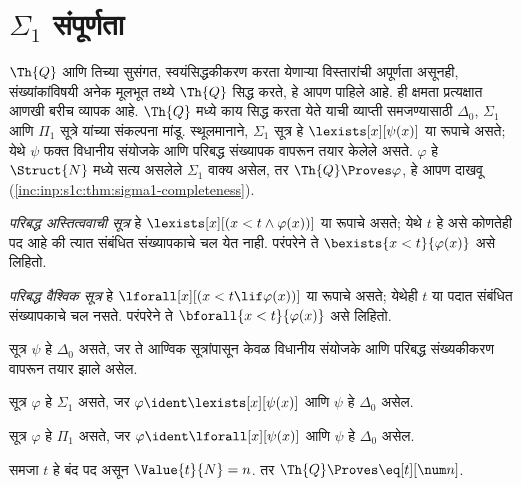 \section{\texorpdfstring{$\Sigma_1$}{सिग्मा-१} संपूर्णता}\label{inc:inp:s1c:sec}

$\Th{Q}$ आणि तिच्या सुसंगत, स्वयंसिद्धकीकरण करता येणाऱ्या
विस्तारांची अपूर्णता असूनही, संख्यांकांविषयी अनेक मूलभूत तथ्ये
$\Th{Q}$ सिद्ध करते, हे आपण पाहिले आहे. ही क्षमता प्रत्यक्षात
आणखी बरीच व्यापक आहे. $\Th{Q}$ मध्ये काय सिद्ध करता येते
याची व्याप्ती समजण्यासाठी $\Delta_0$, $\Sigma_1$ आणि
$\Pi_1$ सूत्रे यांच्या संकल्पना मांडू. स्थूलमानाने,
$\Sigma_1$ सूत्र हे $\lexists[x][\psi(x)]$ या रूपाचे
असते; येथे $\psi$ फक्त विधानीय संयोजके आणि परिबद्ध संख्यापक
वापरून तयार केलेले असते. $\varphi$ हे $\Struct{N}$ मध्ये सत्य
असलेले $\Sigma_1$ वाक्य असेल, तर
$\Th{Q} \Proves \varphi$, हे आपण दाखवू
(\ref{inc:inp:s1c:thm:sigma1-completeness}).

\begin{defn}
\label{inc:inp:s1c:defn:bd-quant}
\emph{परिबद्ध अस्तित्ववाची सूत्र} हे
$\lexists[x][(x < t \land \varphi(x))]$ या रूपाचे असते; येथे $t$
हे असे कोणतेही पद आहे की त्यात संबंधित संख्यापकाचे चल येत नाही. परंपरेने ते
$\bexists{x < t}{\varphi(x)}$ असे लिहितो.

\emph{परिबद्ध वैश्विक सूत्र} हे
$\lforall[x][(x < t \lif \varphi(x))]$ या रूपाचे असते; येथेही
$t$ या पदात संबंधित संख्यापकाचे चल नसते. परंपरेने ते
$\bforall{x < t}{\varphi(x)}$ असे लिहितो.
\end{defn}

\begin{defn}
\label{inc:inp:s1c:defn:delta0-sigma1-pi1-frm}
सूत्र $\psi$ हे $\Delta_0$ असते, जर ते आण्विक
सूत्रांपासून केवळ विधानीय संयोजके आणि परिबद्ध
संख्यकीकरण वापरून तयार झाले असेल.

सूत्र $\varphi$ हे $\Sigma_1$ असते, जर
$\varphi \ident \lexists[x][\psi(x)]$ आणि $\psi$ हे $\Delta_0$
असेल.

सूत्र $\varphi$ हे $\Pi_1$ असते, जर
$\varphi \ident \lforall[x][\psi(x)]$ आणि $\psi$ हे $\Delta_0$
असेल.
\end{defn}

\begin{lem}
\label{inc:inp:s1c:lem:q-proves-clterm-id} समजा $t$ हे बंद पद असून
$\Value{t}{N} = n$. तर $\Th{Q} \Proves \eq[t][\num n]$.
\end{lem}

